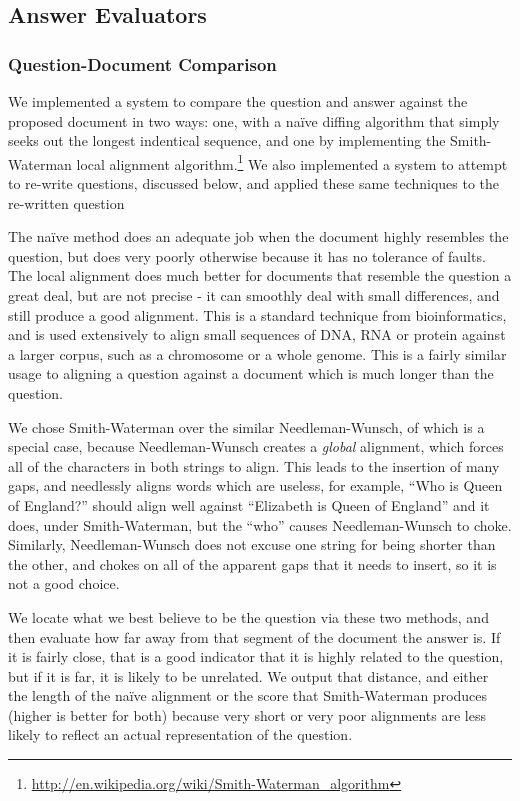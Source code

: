 \documentclass{article}
\begin{document}
\subsection{Answer Evaluators}

\subsubsection{Question-Document Comparison}

	We implemented a system to compare the question and answer against the
	proposed document in two ways:  one, with a na\"ive diffing algorithm that
	simply seeks out the longest indentical sequence, and one by implementing
	the Smith-Waterman local alignment
	algorithm.\footnote{\url{http://en.wikipedia.org/wiki/Smith-Waterman_algorithm}}
	We also implemented a system to attempt to re-write questions, discussed
	below, and applied these same techniques to the re-written question

	The na\"ive method does an adequate job when the document highly resembles
	the question, but does very poorly otherwise because it has no tolerance of
	faults.  The local alignment does much better for documents that resemble
	the question a great deal, but are not precise - it can smoothly deal with
	small differences, and still produce a good alignment.  This is a standard
	technique from bioinformatics, and is used extensively to align small
	sequences of DNA, RNA or protein against a larger corpus, such as a
	chromosome or a whole genome.  This is a fairly similar usage to aligning a
	question against a document which is much longer than the question.

	We chose Smith-Waterman over the similar Needleman-Wunsch, of which is a
	special case, because Needleman-Wunsch creates a \emph{global} alignment,
	which forces all of the characters in both strings to align.  This leads to
	the insertion of many gaps, and needlessly aligns words which are useless,
	for example, ``Who is Queen of England?'' should align well against
	``Elizabeth is Queen of England'' and it does, under Smith-Waterman, but the
	``who'' causes Needleman-Wunsch to choke.  Similarly, Needleman-Wunsch does
	not excuse one string for being shorter than the other, and chokes on all of
	the apparent gaps that it needs to insert, so it is not a good choice.

	We locate what we best believe to be the question via these two methods, and
	then evaluate how far away from that segment of the document the answer is.
	If it is fairly close, that is a good indicator that it is highly related to
	the question, but if it is far, it is likely to be unrelated.  We output
	that distance, and either the length of the na\"ive alignment or the score
	that Smith-Waterman produces (higher is better for both) because very short
	or very poor alignments are less likely to reflect an actual representation
	of the question.
\end{document}
